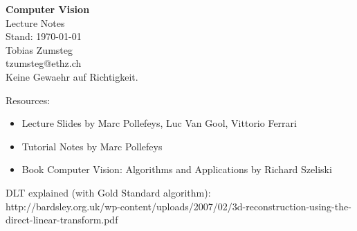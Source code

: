 \documentclass[10pt,a4paper,fleqn,landscape]{scrartcl}
\begin{document}
	

\begin{multicols*}{2}
	\begin{center}
		\vspace*{\fill}
		
		{\huge \textbf{Computer Vision}}\\
		\vspace{0.5em}
		{\LARGE Lecture Notes}\\
		\vspace{1.5em}
		{\large Stand: \today}\\
		\vspace{1em}
		{\Large Tobias Zumsteg}\\
		tzumsteg@ethz.ch\\
		\vspace{1em}
		{\small Keine Gewaehr auf Richtigkeit.}\\
		\vspace{5em}
		
		\vspace*{\fill}
	\end{center}
	\columnbreak
	
	
	Resources:
	\begin{itemize}
		\item Lecture Slides by Marc Pollefeys, Luc Van Gool, Vittorio Ferrari
		\item Tutorial Notes by Marc Pollefeys
		\item Book Computer Vision: Algorithms and Applications by Richard Szeliski
	\end{itemize}
	
	DLT explained (with Gold Standard algorithm):\\
	http://bardsley.org.uk/wp-content/uploads/2007/02/3d-reconstruction-using-the-direct-linear-transform.pdf
	
\end{multicols*}
\newpage

\begin{multicols*}{4}
	{\footnotesize 
		\tableofcontents
	}
\end{multicols*}	
\newpage	
\end{document}
